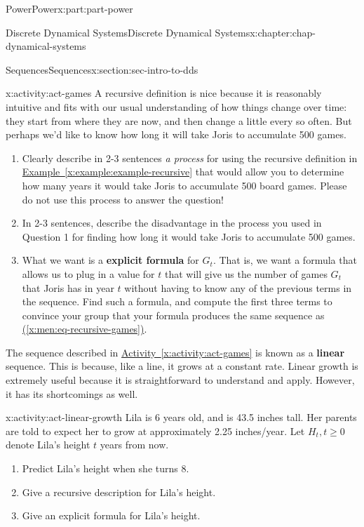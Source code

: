 \documentclass[oneside,10pt,]{book}
\newcommand{\xreffont}{\relax}
\newcommand{\terminology}[1]{\textbf{#1}}
\numberwithin{equation}{section}
\renewcommand{\ge}{\geqslant}
\begin{document}
\begin{partptx}{Power}{}{Power}{}{}{x:part:part-power}
\begin{chapterptx}{Discrete Dynamical Systems}{}{Discrete Dynamical Systems}{}{}{x:chapter:chap-dynamical-systems}
\begin{sectionptx}{Sequences}{}{Sequences}{}{}{x:section:sec-intro-to-dds}
\begin{activity}{}{x:activity:act-games}%
A recursive definition is nice because it is reasonably intuitive and fits with our usual understanding of how things change over time: they start from where they are now, and then change a little every so often. But perhaps we'd like to know how long it will take Joris to accumulate 500 games. %
%
\begin{enumerate}
\item{}Clearly describe in 2-3 sentences \emph{a process} for using the recursive definition in \hyperref[x:example:example-recursive]{Example~{\xreffont\ref{x:example:example-recursive}}} that would allow you to determine how many years it would take Joris to accumulate 500 board games. Please do not use this process to answer the question!%
\item{}In 2-3 sentences, describe the disadvantage in the process you used in Question 1 for finding how long it would take Joris to accumulate 500 games.%
\item{}What we want is a \terminology{explicit formula} for \(G_t\). That is, we want a formula that allows us to plug in a value for \(t\) that will give us the number of games \(G_t\) that Joris has in year \(t\) without having to know any of the previous terms in the sequence. Find such a formula, and compute the first three terms to convince your group that your formula produces the same sequence as \hyperref[x:men:eq-recursive-games]{({\xreffont\ref{x:men:eq-recursive-games}})}.%
\end{enumerate}
\end{activity}%
The sequence described in \hyperref[x:activity:act-games]{Activity~{\xreffont\ref{x:activity:act-games}}} is known as a \terminology{linear} sequence. This is because, like a line, it grows at a constant rate. Linear growth is extremely useful because it is straightforward to understand and apply. However, it has its shortcomings as well.%
\begin{activity}{}{x:activity:act-linear-growth}%
Lila is 6 years old, and is 43.5 inches tall. Her parents are told to expect her to grow at approximately 2.25 inches\slash{}year. Let \(H_t, t\ge 0\) denote Lila's height \(t\) years from now.%
%
\begin{enumerate}
\item{}Predict Lila's height when she turns 8.%
\item{}Give a recursive description for Lila's height.%
\item{}Give an explicit formula for Lila's height.%

\end{enumerate}
\end{activity}
\end{sectionptx}
\end{chapterptx}
\end{partptx}
\end{document}
